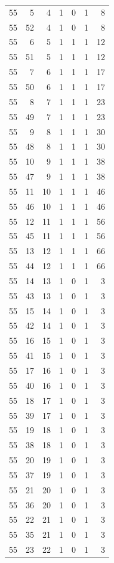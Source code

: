 \begin{longtable}{rrrrrrr}
55 & 5 & 4 & 1 & 0 & 1 & 8\\
55 & 52 & 4 & 1 & 0 & 1 & 8\\
55 & 6 & 5 & 1 & 1 & 1 & 12\\
55 & 51 & 5 & 1 & 1 & 1 & 12\\
55 & 7 & 6 & 1 & 1 & 1 & 17\\
55 & 50 & 6 & 1 & 1 & 1 & 17\\
55 & 8 & 7 & 1 & 1 & 1 & 23\\
55 & 49 & 7 & 1 & 1 & 1 & 23\\
55 & 9 & 8 & 1 & 1 & 1 & 30\\
55 & 48 & 8 & 1 & 1 & 1 & 30\\
55 & 10 & 9 & 1 & 1 & 1 & 38\\
55 & 47 & 9 & 1 & 1 & 1 & 38\\
55 & 11 & 10 & 1 & 1 & 1 & 46\\
55 & 46 & 10 & 1 & 1 & 1 & 46\\
55 & 12 & 11 & 1 & 1 & 1 & 56\\
55 & 45 & 11 & 1 & 1 & 1 & 56\\
55 & 13 & 12 & 1 & 1 & 1 & 66\\
55 & 44 & 12 & 1 & 1 & 1 & 66\\
55 & 14 & 13 & 1 & 0 & 1 & 3\\
55 & 43 & 13 & 1 & 0 & 1 & 3\\
55 & 15 & 14 & 1 & 0 & 1 & 3\\
55 & 42 & 14 & 1 & 0 & 1 & 3\\
55 & 16 & 15 & 1 & 0 & 1 & 3\\
55 & 41 & 15 & 1 & 0 & 1 & 3\\
55 & 17 & 16 & 1 & 0 & 1 & 3\\
55 & 40 & 16 & 1 & 0 & 1 & 3\\
55 & 18 & 17 & 1 & 0 & 1 & 3\\
55 & 39 & 17 & 1 & 0 & 1 & 3\\
55 & 19 & 18 & 1 & 0 & 1 & 3\\
55 & 38 & 18 & 1 & 0 & 1 & 3\\
55 & 20 & 19 & 1 & 0 & 1 & 3\\
55 & 37 & 19 & 1 & 0 & 1 & 3\\
55 & 21 & 20 & 1 & 0 & 1 & 3\\
55 & 36 & 20 & 1 & 0 & 1 & 3\\
55 & 22 & 21 & 1 & 0 & 1 & 3\\
55 & 35 & 21 & 1 & 0 & 1 & 3\\
55 & 23 & 22 & 1 & 0 & 1 & 3\\

\end{longtable}
